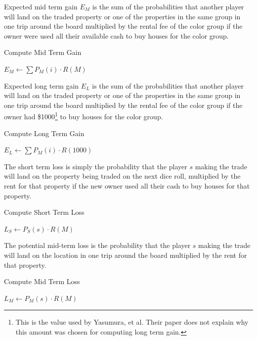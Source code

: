 Expected mid term gain \(E_M\) is the sum of the probabilities that another
player will land on the traded property or one of the properties in the same group in
one trip around the board multiplied by the rental fee of the color group if the
owner were used all their available cash to buy houses for the color group.
\begin{algorithm} 
\caption{Compute Mid Term Gain}
\label{alg_mtg}
\begin{algorithmic}
   \STATE $E_M \gets \sum P_M(i) \cdot R(M)$ 
\end{algorithmic}
\end{algorithm}

Expected long term gain \(E_L\) is the sum of the probabilities that another
player will land on the traded property or one of the properties in the same
group in one trip around the board multiplied by the rental fee of the color
group if the owner had \$1000\footnote{This is the value used by Yasumura, et
al. Their paper does not explain why this amount was chosen for computing long
term gain.} to buy houses for the color group.
\begin{algorithm} 
\caption{Compute Long Term Gain}
\label{alg_ltg}
\begin{algorithmic}
   \STATE $E_L \gets \sum P_M(i) \cdot R(1000)$ 
\end{algorithmic}
\end{algorithm}

The short term loss is simply the probability that the player \(s\) making the
trade will land on the property being traded on the next dice roll, multiplied by the
rent for that property if the new owner used all their cash to buy houses for
that property.
\begin{algorithm} 
\caption{Compute Short Term Loss}
\label{alg_stl}
\begin{algorithmic}
   \STATE $L_S \gets P_S(s) \cdot R(M)$ 
\end{algorithmic}
\end{algorithm}

The potential mid-term loss is the probability that the player \(s\) making the
trade will land on the location in one trip around the board multiplied by the rent
for that property.
\begin{algorithm} 
\caption{Compute Mid Term Loss}
\label{alg_mtl}
\begin{algorithmic}
   \STATE $L_M \gets P_M(s) \cdot R(M)$ 
\end{algorithmic}
\end{algorithm}


